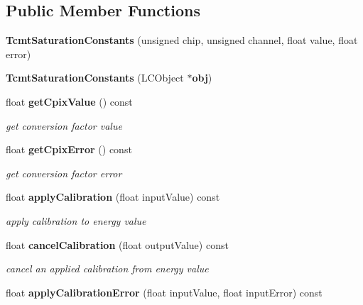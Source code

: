 \subsection*{Public Member Functions}
\begin{DoxyCompactItemize}
\item 
{\bfseries Tcmt\-Saturation\-Constants} (unsigned chip, unsigned channel, float value, float error)\label{classCALICE_1_1TcmtSaturationConstants_a0fda0990cb0fe3a38739584411e64a87}

\item 
{\bfseries Tcmt\-Saturation\-Constants} (L\-C\-Object $\ast${\bf obj})\label{classCALICE_1_1TcmtSaturationConstants_abaffbcb4fd0af3d9152c5dea75316bf5}

\item 
float {\bf get\-Cpix\-Value} () const \label{classCALICE_1_1TcmtSaturationConstants_af9835522fd68a4f67efd90a02082cc76}

\begin{DoxyCompactList}\small\item\em get conversion factor value \end{DoxyCompactList}\item 
float {\bf get\-Cpix\-Error} () const \label{classCALICE_1_1TcmtSaturationConstants_add6f57e7924d554ec4954ba11f0469cf}

\begin{DoxyCompactList}\small\item\em get conversion factor error \end{DoxyCompactList}\item 
float {\bf apply\-Calibration} (float input\-Value) const \label{classCALICE_1_1TcmtSaturationConstants_a7a6e4f80607f938d3a739bf2527f3a56}

\begin{DoxyCompactList}\small\item\em apply calibration to energy value \end{DoxyCompactList}\item 
float {\bf cancel\-Calibration} (float output\-Value) const \label{classCALICE_1_1TcmtSaturationConstants_a4aeddf593c38c241ab1a299dcafe3e3e}

\begin{DoxyCompactList}\small\item\em cancel an applied calibration from energy value \end{DoxyCompactList}\item 
float {\bf apply\-Calibration\-Error} (float input\-Value, float input\-Error) const \label{classCALICE_1_1TcmtSaturationConstants_a256def068f131f98cb3a62669cc4dcaa}


\end{DoxyCompactItemize}
